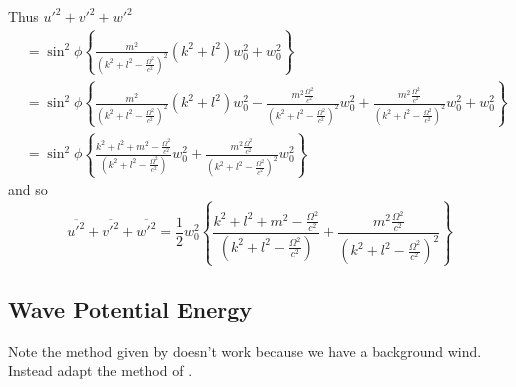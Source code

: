 \documentclass[12pt]{article}
\begin{document}
Thus $u'^2 + v'^2 + w'^2$
\begin{align}
&  = \sin^2\phi \left\{ \frac{m^2}{\left(k^2 + l^2 -\frac{\Omega ^2}{c^2}\right)^2} \left(k^2 + l^2\right)w_0^2 + w_0^2 \right\}  \\
&  = \sin^2\phi \left\{ \frac{m^2}{\left(k^2 + l^2 -\frac{\Omega^2}{c^2}\right)^2} \left(k^2 + l^2\right)w_0^2  - \frac{m^2 \frac{\Omega^2}{c^2}}{\left(k^2 + l^2 -\frac{\Omega^2}{c^2}\right)^2}w_0^2 + \frac{m^2 \frac{\Omega^2}{c^2}}{\left(k^2 + l^2 -\frac{\Omega^2}{c^2}\right)^2}w_0^2 + w_0^2 \right\} \\
&  = \sin^2\phi \left\{ \frac{k^2 + l^2  + m^2 -\frac{\Omega^2}{c^2}}{\left(k^2 + l^2 -\frac{\Omega^2}{c^2}\right)} w_0^2 + \frac{m^2 \frac{\Omega^2}{c^2}}{\left(k^2 + l^2 -\frac{\Omega^2}{c^2}\right)^2}w_0^2 \right\}
\end{align}
and so 
\begin{equation}
\overline{u'^2} + \overline{v'^2} + \overline{w'^2} = \frac{1}{2} w_0^2 \left\{ \frac{k^2 + l^2  + m^2 -\frac{\Omega^2}{c^2}}{\left(k^2 + l^2 -\frac{\Omega^2}{c^2}\right)} + \frac{m^2 \frac{\Omega^2}{c^2}}{\left(k^2 + l^2 -\frac{\Omega^2}{c^2}\right)^2} \right\}
\end{equation}

\subsection{Wave Potential Energy}
Note the method given by \citet{nappo02} doesn't work because we have a background wind. Instead adapt the method of \citet{lighthill78}. 
\end{document}
